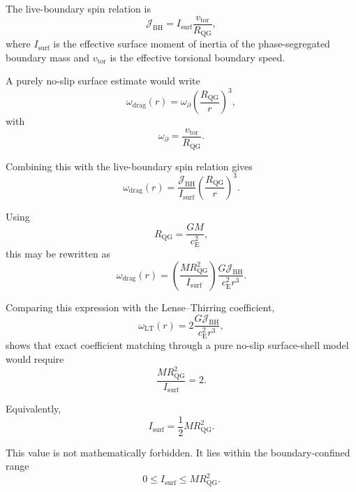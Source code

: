 The live-boundary spin relation is
\begin{equation}
    \mathcal{J}_{\mathrm{BH}} = I_{\mathrm{surf}} \frac{v_{\mathrm{tor}}}{R_{\mathrm{QG}}},
\end{equation}
where $I_{\mathrm{surf}}$ is the effective surface moment of inertia of the phase-segregated boundary mass and $v_{\mathrm{tor}}$ is the effective torsional boundary speed.

A purely no-slip surface estimate would write
\begin{equation}
    \omega_{\mathrm{drag}}(r) = \omega_{\partial} \left( \frac{R_{\mathrm{QG}}}{r} \right)^3,
\end{equation}
with
\begin{equation}
    \omega_{\partial} = \frac{v_{\mathrm{tor}}}{R_{\mathrm{QG}}}.
\end{equation}

Combining this with the live-boundary spin relation gives
\begin{equation}
    \omega_{\mathrm{drag}}(r) = \frac{\mathcal{J}_{\mathrm{BH}}}{I_{\mathrm{surf}}} \left( \frac{R_{\mathrm{QG}}}{r} \right)^3.
\end{equation}

Using
\begin{equation}
    R_{\mathrm{QG}} = \frac{GM}{c_{\mathrm{E}}^2},
\end{equation}
this may be rewritten as
\begin{equation}
    \omega_{\mathrm{drag}}(r) = \left( \frac{M R_{\mathrm{QG}}^2}{I_{\mathrm{surf}}} \right) \frac{G\mathcal{J}_{\mathrm{BH}}}{c_{\mathrm{E}}^2r^3}.
\end{equation}

Comparing this expression with the Lense--Thirring coefficient,
\begin{equation}
    \omega_{\mathrm{LT}}(r) = 2 \frac{G\mathcal{J}_{\mathrm{BH}}}{c_{\mathrm{E}}^2r^3},
\end{equation}
shows that exact coefficient matching through a pure no-slip surface-shell model would require
\begin{equation}
    \frac{M R_{\mathrm{QG}}^2}{I_{\mathrm{surf}}} = 2.
\end{equation}

Equivalently,
\begin{equation}
    I_{\mathrm{surf}} = \frac{1}{2} M R_{\mathrm{QG}}^2.
\end{equation}

This value is not mathematically forbidden. It lies within the boundary-confined range
\begin{equation}
    0 \leq I_{\mathrm{surf}} \leq M R_{\mathrm{QG}}^2.
\end{equation}

